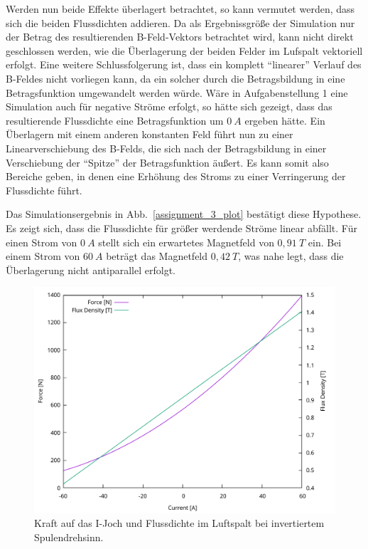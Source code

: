 \documentclass[conference,a4paper,twoside]{IEEEtran}
\begin{document}
Werden nun beide Effekte überlagert betrachtet, so kann vermutet werden, dass sich die beiden Flussdichten addieren. Da als Ergebnissgröße der Simulation nur der Betrag des resultierenden B-Feld-Vektors betrachtet wird, kann nicht direkt geschlossen werden, wie die Überlagerung der beiden Felder im Lufspalt vektoriell erfolgt. Eine weitere Schlussfolgerung ist, dass ein komplett ``linearer'' Verlauf des B-Feldes nicht vorliegen kann, da ein solcher durch die Betragsbildung in eine Betragsfunktion umgewandelt werden würde. Wäre in Aufgabenstellung 1 eine Simulation auch für negative Ströme erfolgt, so hätte sich gezeigt, dass das resultierende Flussdichte eine Betragsfunktion um $0\ A$ ergeben hätte. Ein Überlagern mit einem anderen konstanten Feld führt nun zu einer Linearverschiebung des B-Felds, die sich nach der Betragsbildung in einer Verschiebung der ``Spitze'' der Betragsfunktion äußert. Es kann somit also Bereiche geben, in denen eine Erhöhung des Stroms zu einer Verringerung der Flussdichte führt.

Das Simulationsergebnis in Abb.~\ref{assignment_3_plot} bestätigt diese Hypothese. Es zeigt sich, dass die Flussdichte für größer werdende Ströme linear abfällt. Für einen Strom von $0\ A$ stellt sich ein erwartetes Magnetfeld von $0,91\ T$ ein. Bei einem Strom von $60\ A$ beträgt das Magnetfeld $0,42\ T$, was nahe legt, dass die Überlagerung nicht antiparallel erfolgt.

\begin{figure}
\centerline{\includegraphics[width=\columnwidth]{../assets/assignment_3_plot_swapped_polarity.pdf}}
\caption{Kraft auf das I-Joch und Flussdichte im Luftspalt bei invertiertem Spulendrehsinn.}
\label{assignment_3_plot_swapped_polarity}
\end{figure}
\end{document}
